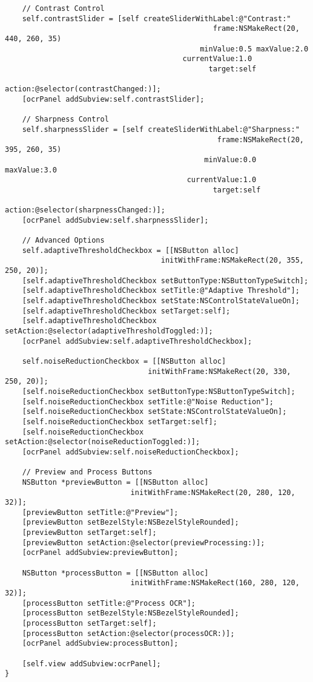 \begin{verbatim}
    // Contrast Control  
    self.contrastSlider = [self createSliderWithLabel:@"Contrast:" 
                                                frame:NSMakeRect(20, 440, 260, 35)
                                             minValue:0.5 maxValue:2.0 
                                         currentValue:1.0
                                               target:self
                                               action:@selector(contrastChanged:)];
    [ocrPanel addSubview:self.contrastSlider];
    
    // Sharpness Control
    self.sharpnessSlider = [self createSliderWithLabel:@"Sharpness:" 
                                                 frame:NSMakeRect(20, 395, 260, 35)
                                              minValue:0.0 maxValue:3.0 
                                          currentValue:1.0
                                                target:self
                                                action:@selector(sharpnessChanged:)];
    [ocrPanel addSubview:self.sharpnessSlider];
    
    // Advanced Options
    self.adaptiveThresholdCheckbox = [[NSButton alloc] 
                                    initWithFrame:NSMakeRect(20, 355, 250, 20)];
    [self.adaptiveThresholdCheckbox setButtonType:NSButtonTypeSwitch];
    [self.adaptiveThresholdCheckbox setTitle:@"Adaptive Threshold"];
    [self.adaptiveThresholdCheckbox setState:NSControlStateValueOn];
    [self.adaptiveThresholdCheckbox setTarget:self];
    [self.adaptiveThresholdCheckbox setAction:@selector(adaptiveThresholdToggled:)];
    [ocrPanel addSubview:self.adaptiveThresholdCheckbox];
    
    self.noiseReductionCheckbox = [[NSButton alloc] 
                                 initWithFrame:NSMakeRect(20, 330, 250, 20)];
    [self.noiseReductionCheckbox setButtonType:NSButtonTypeSwitch];
    [self.noiseReductionCheckbox setTitle:@"Noise Reduction"];
    [self.noiseReductionCheckbox setState:NSControlStateValueOn];
    [self.noiseReductionCheckbox setTarget:self];
    [self.noiseReductionCheckbox setAction:@selector(noiseReductionToggled:)];
    [ocrPanel addSubview:self.noiseReductionCheckbox];
    
    // Preview and Process Buttons
    NSButton *previewButton = [[NSButton alloc] 
                             initWithFrame:NSMakeRect(20, 280, 120, 32)];
    [previewButton setTitle:@"Preview"];
    [previewButton setBezelStyle:NSBezelStyleRounded];
    [previewButton setTarget:self];
    [previewButton setAction:@selector(previewProcessing:)];
    [ocrPanel addSubview:previewButton];
    
    NSButton *processButton = [[NSButton alloc] 
                             initWithFrame:NSMakeRect(160, 280, 120, 32)];
    [processButton setTitle:@"Process OCR"];
    [processButton setBezelStyle:NSBezelStyleRounded];
    [processButton setTarget:self];
    [processButton setAction:@selector(processOCR:)];
    [ocrPanel addSubview:processButton];
    
    [self.view addSubview:ocrPanel];
}
\end{verbatim}

